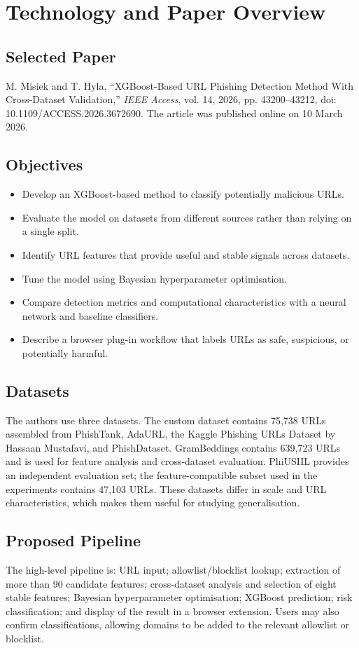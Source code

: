 \chapter{Technology and Paper Overview}
\setcounter{equation}{0}
\section{Selected Paper}
M. Misiek and T. Hyla, ``XGBoost-Based URL Phishing Detection Method With Cross-Dataset Validation,'' \textit{IEEE Access}, vol. 14, 2026, pp. 43200--43212, doi: 10.1109/ACCESS.2026.3672690. The article was published online on 10 March 2026.\cite{bib1}

\section{Objectives}
\begin{itemize}
\item Develop an XGBoost-based method to classify potentially malicious URLs.
\item Evaluate the model on datasets from different sources rather than relying on a single split.
\item Identify URL features that provide useful and stable signals across datasets.
\item Tune the model using Bayesian hyperparameter optimisation.
\item Compare detection metrics and computational characteristics with a neural network and baseline classifiers.
\item Describe a browser plug-in workflow that labels URLs as safe, suspicious, or potentially harmful.
\end{itemize}

\section{Datasets}
The authors use three datasets. The custom dataset contains 75,738 URLs assembled from PhishTank, AdaURL, the Kaggle Phishing URLs Dataset by Hassaan Mustafavi, and PhishDataset. GramBeddings contains 639,723 URLs and is used for feature analysis and cross-dataset evaluation. PhiUSIIL provides an independent evaluation set; the feature-compatible subset used in the experiments contains 47,103 URLs. These datasets differ in scale and URL characteristics, which makes them useful for studying generalisation.\cite{bib1}

\section{Proposed Pipeline}
The high-level pipeline is: URL input; allowlist/blocklist lookup; extraction of more than 90 candidate features; cross-dataset analysis and selection of eight stable features; Bayesian hyperparameter optimisation; XGBoost prediction; risk classification; and display of the result in a browser extension. Users may also confirm classifications, allowing domains to be added to the relevant allowlist or blocklist.\cite{bib1}

